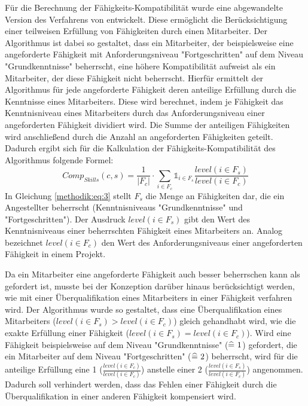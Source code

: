 Für die Berechnung der Fähigkeits-Kompatibilität wurde eine abgewandelte Version des Verfahrens von \textcite[S. 269ff.]{pizzato:2:inproceedings} entwickelt.
Diese ermöglicht die Berücksichtigung einer teilweisen Erfüllung von Fähigkeiten durch einen Mitarbeiter.
Der Algorithmus ist dabei so gestaltet, dass ein Mitarbeiter, der beispielsweise eine angeforderte Fähigkeit mit Anforderungsniveau "Fortgeschritten" auf dem Niveau "Grundkenntnisse" beherrscht, eine höhere Kompatibilität aufweist als ein Mitarbeiter, der diese Fähigkeit nicht beherrscht.
Hierfür ermittelt der Algorithmus für jede angeforderte Fähigkeit deren anteilige Erfüllung durch die Kenntnisse eines Mitarbeiters.
Diese wird berechnet, indem je Fähigkeit das Kenntnisniveau eines Mitarbeiters durch das Anforderungsniveau einer angeforderten Fähigkeit dividiert wird.
Die Summe der anteiligen Fähigkeiten wird anschließend durch die Anzahl an angeforderten Fähigkeiten geteilt.
Dadurch ergibt sich für die Kalkulation der Fähigkeits-Kompatibilität des Algorithmus folgende Formel:
\begin{equation}\label{methodik:eq:3}
    Comp_{Skills}(c,s)=\frac{1}{|F_{c}|} \cdot \sum\limits_{i \in F_{c}} \mathbb{1}_{i \in F_{s}} \frac{level(i \in F_{s})}{level(i \in F_{c})}
\end{equation}
In Gleichung \ref{methodik:eq:3} stellt $F_{s}$ die Menge an Fähigkeiten dar, die ein Angestellter beherrscht (Kenntnisniveaus "Grundkenntnisse" und "Fortgeschritten").
Der Ausdruck $level(i \in F_{s})$ gibt den Wert des Kenntnisniveaus einer beherrschten Fähigkeit eines Mitarbeiters an.
Analog bezeichnet $level(i \in F_{c})$ den Wert des Anforderungsniveaus einer angeforderten Fähigkeit in einem Projekt.

Da ein Mitarbeiter eine angeforderte Fähigkeit auch besser beherrschen kann als gefordert ist, musste bei der Konzeption darüber hinaus berücksichtigt werden, wie mit einer Überqualifikation eines Mitarbeiters in einer Fähigkeit verfahren wird.
Der Algorithmus wurde so gestaltet, dass eine Überqualifikation eines Mitarbeiters ($level(i \in F_{s}) > level(i \in F_{c})$) gleich gehandhabt wird, wie die exakte Erfüllung einer Fähigkeit ($level(i \in F_{s}) = level(i \in F_{c})$).
Wird eine Fähigkeit beispielsweise auf dem Niveau "Grundkenntnisse" ($\widehat{=} \textnormal{ }1$) gefordert, die ein Mitarbeiter auf dem Niveau "Fortgeschritten" ($\widehat{=} \textnormal{ }2$) beherrscht, wird für die anteilige Erfüllung eine 1 ($\frac{level(i \in F_{c})}{level(i \in F_{c})}$) anstelle einer 2 ($\frac{level(i \in F_{s})}{level(i \in F_{c})}$) angenommen.
Dadurch soll verhindert werden, dass das Fehlen einer Fähigkeit durch die Überqualifikation in einer anderen Fähigkeit kompensiert wird.

